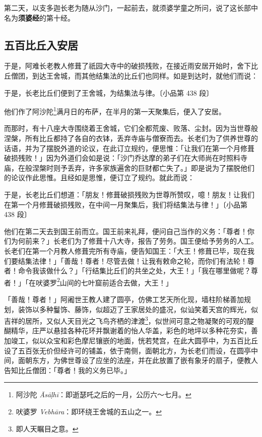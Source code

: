 第二天，以支多迦长老为随从沙门，一起前去，就须婆学童之所问，说了这长部中名为\textbf{须婆经}的第十经。

\subsection*{五百比丘入安居}

于是，阿难长老教人修葺了祇园大寺中的破损残败，在接近雨安居开始时，舍下比丘僧团，到达王舍城，而其他结集法的比丘们也同样。如是到达时，就他们而说：

\begin{quoting}于是，长老比丘们便到了王舍城，为结集法与律。{\bluefootnotesize 〔小品第 438 段〕}\end{quoting}

他们作了阿沙陀\footnote{阿沙陀 \textit{Āsāḷhī}：即逝瑟吒之后的一月，公历六～七月。}满月日的布萨，在半月的第一天聚集后，便入了安居。

而那时，有十八座大寺围绕着王舍城，它们全都荒废、败落、尘封。因为当世尊般涅槃，所有比丘都持了各自的衣钵，丢弃寺庙与僧寮而去。长老们为了供养世尊的话语，并为了摆脱外道的论议，在此订立规约，便思惟：「让我们在第一个月修葺破损残败！」因为外道们会如是说：「沙门乔达摩的弟子们在大师尚在时照料寺庙，在般涅槃时则予丢弃，许多家族遍舍的巨财都亡失了。」即是说为了摆脱他们的论议作此思惟。且经如是思惟，便订立了规约。就此而说：

\begin{quoting}于是，长老比丘们想道：「朋友！修葺破损残败为世尊所赞叹，噫！朋友！让我们在第一个月修葺破损残败，在中间一月聚集后，我们将结集法与律！」{\bluefootnotesize 〔小品第 438 段〕}\end{quoting}

他们在第二天去到国王前而立。国王前来礼拜，便问自己当作的义务：「尊者！你们为何前来？」长老们为了修葺十八大寺，报告了劳务。国王便给予劳务的人工。长老们在第一个月教人修葺完所有寺庙，便告知国王：「大王！修葺已毕，现在我们要结集法律！」「善哉！尊者！尽管去做！让我有敕命之轮，而你们有法轮！尊者！命令我该做什么？」「行结集比丘们的共坐之处，大王！」「我在哪里做呢？尊者！」「在吠婆罗\footnote{吠婆罗 \textit{Vebhāra}：即环绕王舍城的五山之一。}山间的七叶窟前适合去做，大王！」

「善哉！尊者！」阿阇世王教人建了圆亭，仿佛工艺天所化现，墙柱阶梯善加规划，装饰以多种鬘饰、藤饰，似超迈了王家居处的盛况，似讪笑着天宫的辉光，似吉祥的居所，又似人天目光之飞鸟齐栖的津渡\footnote{即人天瞩目之意。}，似世间可意之物凝聚的可观的醍醐精华，庄严以悬挂各种花环并飘谢着的怡人华盖，彩色的地坪以多种花夯实，善加竣工，似以众宝和彩色摩尼镶嵌的地面，恍若梵宫，在此大圆亭中，为五百比丘设了五百张无价但经许可的铺盖，依于南侧，面朝北方，为长老们而设，在圆亭中间，面朝东方，为佛世尊设了应坐的法座，并在此放置了嵌有象牙的扇子，便教人告知比丘僧团：「尊者！我的义务已毕。」

